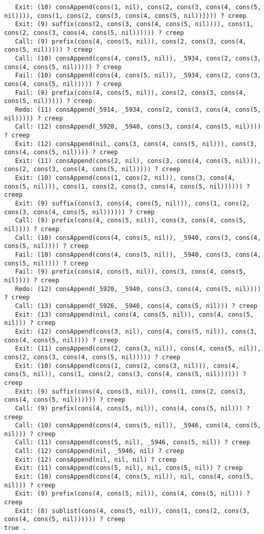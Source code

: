 \documentclass[fullpage]{article}
\begin{document}
\begin{verbatim}
   Exit: (10) consAppend(cons(1, nil), cons(2, cons(3, cons(4, cons(5, nil)))), cons(1, cons(2, cons(3, cons(4, cons(5, nil)))))) ? creep
   Exit: (9) suffix(cons(2, cons(3, cons(4, cons(5, nil)))), cons(1, cons(2, cons(3, cons(4, cons(5, nil)))))) ? creep
   Call: (9) prefix(cons(4, cons(5, nil)), cons(2, cons(3, cons(4, cons(5, nil))))) ? creep
   Call: (10) consAppend(cons(4, cons(5, nil)), _5934, cons(2, cons(3, cons(4, cons(5, nil))))) ? creep
   Fail: (10) consAppend(cons(4, cons(5, nil)), _5934, cons(2, cons(3, cons(4, cons(5, nil))))) ? creep
   Fail: (9) prefix(cons(4, cons(5, nil)), cons(2, cons(3, cons(4, cons(5, nil))))) ? creep
   Redo: (11) consAppend(_5914, _5934, cons(2, cons(3, cons(4, cons(5, nil))))) ? creep
   Call: (12) consAppend(_5920, _5940, cons(3, cons(4, cons(5, nil)))) ? creep
   Exit: (12) consAppend(nil, cons(3, cons(4, cons(5, nil))), cons(3, cons(4, cons(5, nil)))) ? creep
   Exit: (11) consAppend(cons(2, nil), cons(3, cons(4, cons(5, nil))), cons(2, cons(3, cons(4, cons(5, nil))))) ? creep
   Exit: (10) consAppend(cons(1, cons(2, nil)), cons(3, cons(4, cons(5, nil))), cons(1, cons(2, cons(3, cons(4, cons(5, nil)))))) ? creep
   Exit: (9) suffix(cons(3, cons(4, cons(5, nil))), cons(1, cons(2, cons(3, cons(4, cons(5, nil)))))) ? creep
   Call: (9) prefix(cons(4, cons(5, nil)), cons(3, cons(4, cons(5, nil)))) ? creep
   Call: (10) consAppend(cons(4, cons(5, nil)), _5940, cons(3, cons(4, cons(5, nil)))) ? creep
   Fail: (10) consAppend(cons(4, cons(5, nil)), _5940, cons(3, cons(4, cons(5, nil)))) ? creep
   Fail: (9) prefix(cons(4, cons(5, nil)), cons(3, cons(4, cons(5, nil)))) ? creep
   Redo: (12) consAppend(_5920, _5940, cons(3, cons(4, cons(5, nil)))) ? creep
   Call: (13) consAppend(_5926, _5946, cons(4, cons(5, nil))) ? creep
   Exit: (13) consAppend(nil, cons(4, cons(5, nil)), cons(4, cons(5, nil))) ? creep
   Exit: (12) consAppend(cons(3, nil), cons(4, cons(5, nil)), cons(3, cons(4, cons(5, nil)))) ? creep
   Exit: (11) consAppend(cons(2, cons(3, nil)), cons(4, cons(5, nil)), cons(2, cons(3, cons(4, cons(5, nil))))) ? creep
   Exit: (10) consAppend(cons(1, cons(2, cons(3, nil))), cons(4, cons(5, nil)), cons(1, cons(2, cons(3, cons(4, cons(5, nil)))))) ? creep
   Exit: (9) suffix(cons(4, cons(5, nil)), cons(1, cons(2, cons(3, cons(4, cons(5, nil)))))) ? creep
   Call: (9) prefix(cons(4, cons(5, nil)), cons(4, cons(5, nil))) ? creep
   Call: (10) consAppend(cons(4, cons(5, nil)), _5946, cons(4, cons(5, nil))) ? creep
   Call: (11) consAppend(cons(5, nil), _5946, cons(5, nil)) ? creep
   Call: (12) consAppend(nil, _5946, nil) ? creep
   Exit: (12) consAppend(nil, nil, nil) ? creep
   Exit: (11) consAppend(cons(5, nil), nil, cons(5, nil)) ? creep
   Exit: (10) consAppend(cons(4, cons(5, nil)), nil, cons(4, cons(5, nil))) ? creep
   Exit: (9) prefix(cons(4, cons(5, nil)), cons(4, cons(5, nil))) ? creep
   Exit: (8) sublist(cons(4, cons(5, nil)), cons(1, cons(2, cons(3, cons(4, cons(5, nil)))))) ? creep
true .

\end{verbatim}
\end{document}
